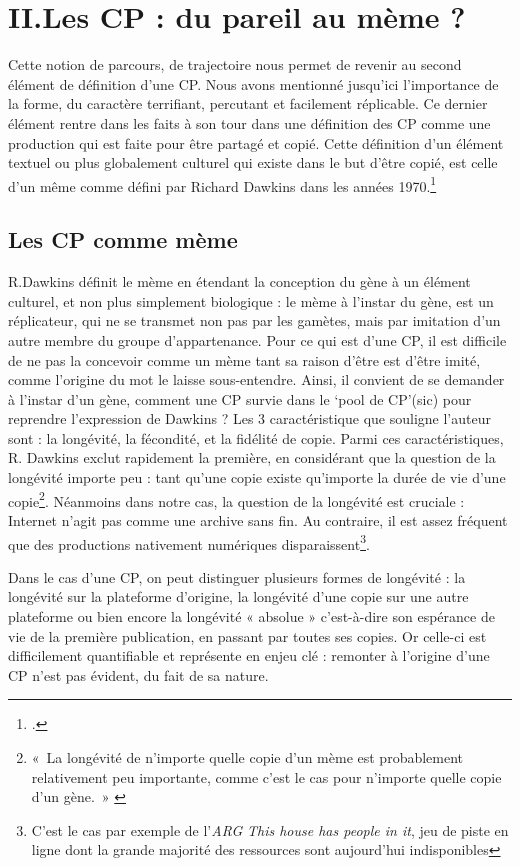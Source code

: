 \documentclass[12pt,a4paper,oneside,titlepage]{article} %
\begin{document}
\section*{II.Les CP : du pareil au mème ?}
	
	Cette notion de parcours, de trajectoire nous permet de revenir au second élément de définition d’une CP. Nous avons mentionné jusqu’ici l’importance de la forme, du caractère terrifiant, percutant et facilement réplicable. Ce dernier élément rentre dans les faits à son tour dans une définition des CP comme une production qui est faite pour être partagé et copié. Cette définition d’un élément textuel ou plus globalement culturel qui existe dans le but d’être copié, est celle d’un même comme défini par Richard Dawkins dans les années 1970.\footcite{dawkins_gene_2003}
	\subsection*{Les CP comme mème}
	R.Dawkins définit le mème en étendant la conception du gène à un élément culturel, et non plus simplement biologique : le mème à l’instar du gène, est un réplicateur, qui ne se transmet non pas par les gamètes, mais par imitation d’un autre membre du groupe d’appartenance. Pour ce qui est d’une CP, il est difficile de ne pas la concevoir comme un mème tant sa raison d’être est d’être imité, comme l’origine du mot le laisse sous-entendre. 
	Ainsi, il convient de se demander à l’instar d’un gène, comment une CP survie dans le ‘pool de CP’(sic) pour reprendre l’expression de Dawkins ? 
	Les 3 caractéristique que souligne l’auteur sont : la longévité, la fécondité, et la fidélité de copie. Parmi ces caractéristiques, R. Dawkins exclut rapidement la première, en considérant que la question de la longévité importe peu : tant qu’une copie existe qu’importe la durée de vie d’une copie\footnote{« La longévité de n’importe quelle copie d’un mème est probablement relativement peu importante, comme c’est le cas pour n’importe quelle copie d’un gène. » \cite[voir p.218]{dawkins_gene_2003}}. Néanmoins dans notre cas, la question de la longévité est cruciale : Internet n’agit pas comme une archive sans fin. Au contraire, il est assez fréquent que des productions nativement numériques disparaissent\footnote{C'est le cas par exemple de l'\emph{ARG} \emph{This house has people in it}, jeu de piste en ligne dont la grande majorité des ressources sont aujourd'hui indisponibles}. 
	
	Dans le cas d’une CP, on peut distinguer plusieurs formes de longévité : la longévité sur la plateforme d’origine, la longévité d’une copie sur une autre plateforme ou bien encore la longévité « absolue » c’est-à-dire son espérance de vie de la première publication, en passant par toutes ses copies. Or celle-ci est difficilement quantifiable et représente en enjeu clé : remonter à l’origine d’une CP n’est pas évident, du fait de sa nature.
\end{document}

